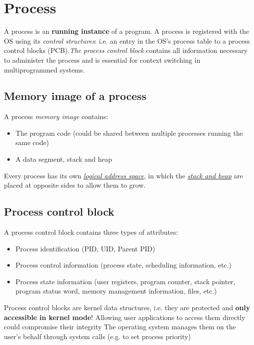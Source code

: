 \documentclass{article}
\newcommand{\worddef}[1]{\hyperref[sec:reference]{\textit{#1}}}
\begin{document}
\section{Process}
\begin{flushleft}
 A process is an \textbf{running instance} of a program. A process is registered with the OS using its \textit{control structures}: i.e. an entry in the OS’s process table to a process control blocks (PCB).\textit{The process control block}  contains all information necessary to administer the process and is essential for context switching in multiprogrammed systems.
\end{flushleft}

\subsection{Memory image of a process}
\begin{flushleft}
A process \textit{memory image} contains:
\begin{itemize}
	\item The program code (could be shared between multiple processes running the same code)
	\item A data segment, stack and heap
\end{itemize}
Every process has its own \worddef{logical address space}, in which the \worddef{stack and heap} are placed at opposite sides to allow them to grow.
\end{flushleft}

\subsection{Process control block}
\begin{flushleft}
A process control block contains three types of attributes:
\begin{itemize}
	\item Process identification (PID, UID, Parent PID) 
	\item Process control information (process state, scheduling information, etc.)
	\item Process state information (user registers, program counter, stack pointer, program status word, memory management information, files, etc.) 
\end{itemize}
Process control blocks are kernel data structures, i.e. they are protected and \textbf{only accessible in kernel mode}! Allowing user applications to access them directly could compromise their integrity The operating system manages them on the user’s behalf through system calls (e.g. to set process priority)
\end{flushleft}
\end{document}
